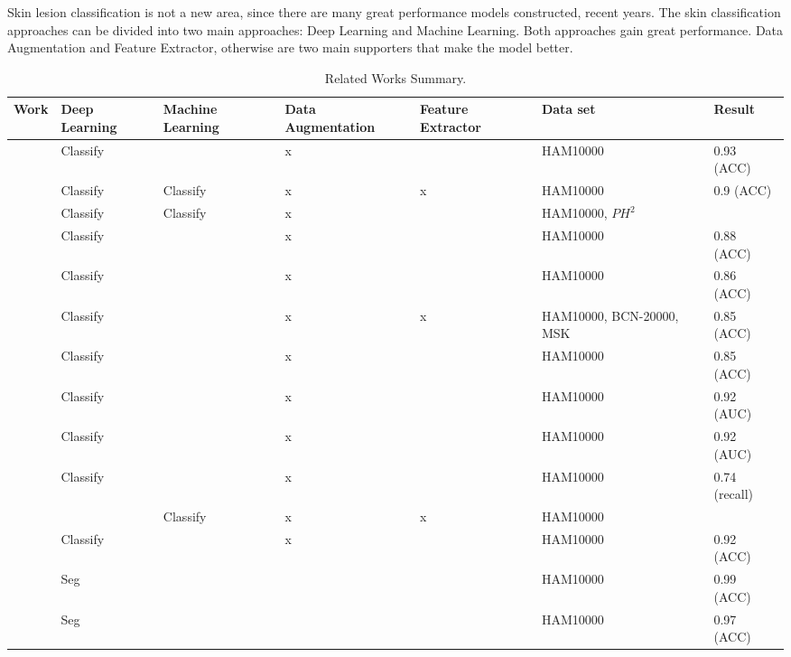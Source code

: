 \documentclass[sensors,article,submit,pdftex,moreauthors]{Definitions/mdpi}
\begin{document}
{Skin lesion classification is not a new area, since there are many great performance models constructed, recent years. The skin classification approaches can be divided into two main approaches: Deep Learning and Machine Learning. Both approaches gain great performance. Data Augmentation and Feature Extractor, otherwise are two main supporters that make the model better.
\begin{table}[H]
	\centering
	\begin{tabular}{| c | p{1.5cm} | p{1.5cm} | p{2cm} | p{1.5cm} | p{2cm} | p{1cm} |}
		\hline
		Work & Deep Learning & Machine Learning & Data 
		Augmentation & Feature Extractor & Data set & Result\\
		\hline
		\cite{03358} & Classify & & x & & HAM10000 & 0.93 (ACC)\\
		\hline
		\cite{03798} & Classify & Classify & x & x & HAM10000 & 0.9 (ACC)\\
		\hline
		\cite{10348} & Classify & Classify & x & & HAM10000, $PH^2$ & \\
		\hline
		\cite{09418} & Classify & & x & & HAM10000 & 0.88 (ACC)\\
		\hline
		\cite{01284} & Classify & & x & & HAM10000 & 0.86 (ACC)\\
		\hline
		\cite{06612} & Classify & & x & x & HAM10000, BCN-20000, MSK & 0.85 (ACC)\\
		\hline
		\cite{03225} & Classify & & x & & HAM10000 & 0.85 (ACC)\\
		\hline
		\cite{12602} & Classify & & x & & HAM10000 & 0.92 (AUC)\\
		\hline
		\cite{03426} & Classify & & x & & HAM10000 & 0.92 (AUC)\\
		\hline
		\cite{03910} & Classify & & x & & HAM10000 & 0.74 (recall)\\
		\hline
		\cite{05045} & & Classify & x & x & HAM10000 & \\
		\hline
		\cite{2101.133} & Classify&  & x &  & HAM10000 & 0.92 (ACC)\\
		\hline
		\cite{22750} & Seg&  &  &  & HAM10000 & 0.99 (ACC)\\
		\hline
		\cite{9445180} & Seg &  &  &  & HAM10000 & 0.97 (ACC)\\
		\hline
	\end{tabular}
	\caption{Related Works Summary.}
	\label{table:related-work-summary}
\end{table}
}
\end{document}
